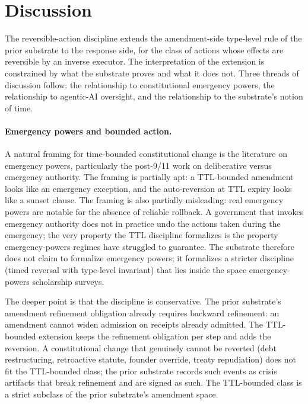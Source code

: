 \section{Discussion}
\label{sec:discussion-ra}

The reversible-action discipline extends the amendment-side type-level
rule of the prior substrate \cite{programmableSovereigntyAnonymous} to
the response side, for the class of actions whose effects are
reversible by an inverse executor. The interpretation of the extension
is constrained by what the substrate proves and what it does not. Three
threads of discussion follow: the relationship to constitutional
emergency powers, the relationship to agentic-AI oversight, and the
relationship to the substrate's notion of time.

\paragraph{Emergency powers and bounded action.}
A natural framing for time-bounded constitutional change is the
literature on emergency powers, particularly the post-9/11 work on
deliberative versus emergency authority. The framing is partially
apt: a TTL-bounded amendment looks like an emergency exception, and
the auto-reversion at TTL expiry looks like a sunset clause. The
framing is also partially misleading: real emergency powers are
notable for the absence of reliable rollback. A government that
invokes emergency authority does not in practice undo the actions
taken during the emergency; the very property the TTL discipline
formalizes is the property emergency-powers regimes have struggled to
guarantee. The substrate therefore does not claim to formalize
emergency powers; it formalizes a stricter discipline (timed reversal
with type-level invariant) that lies inside the space emergency-
powers scholarship surveys.

The deeper point is that the discipline is conservative. The prior
substrate's amendment refinement obligation
\cite{programmableSovereigntyAnonymous} already requires backward
refinement: an amendment cannot widen admission on receipts already
admitted. The TTL-bounded extension keeps the refinement obligation per
step and adds the reversion. A constitutional change that genuinely
cannot be reverted (debt restructuring, retroactive statute, founder
override, treaty repudiation) does not fit the TTL-bounded class; the
prior substrate records such events as crisis artifacts that break
refinement and are signed as such. The TTL-bounded class is a strict
subclass of the prior substrate's amendment space.


